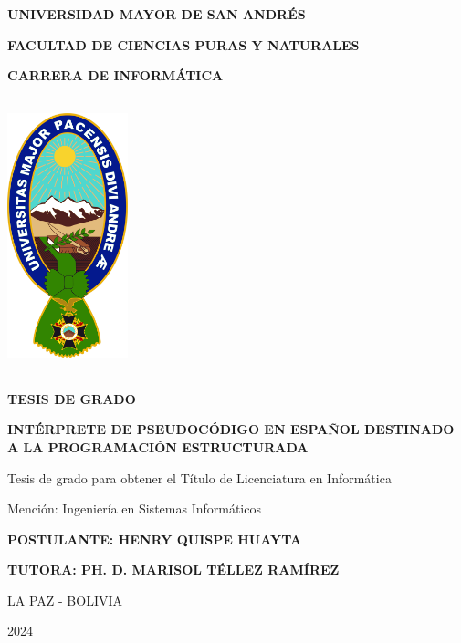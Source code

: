 \begin{titlepage}
  \centering
  {\fontsize{20}{0} \textbf{UNIVERSIDAD MAYOR DE SAN ANDRÉS}}\\
  {\fontsize{16}{0} \textbf{FACULTAD DE CIENCIAS PURAS Y NATURALES}\par}
  {\fontsize{16}{0} \textbf{CARRERA DE INFORMÁTICA}\par}
  \vspace{1cm}
  \includegraphics[height=8cm, width=3.5cm]{images/umsa.png}\par
  {\fontsize{12}{0} \textbf{TESIS DE GRADO}\par}
  {\fontsize{16}{0} \textbf{INTÉRPRETE DE PSEUDOCÓDIGO EN ESPAÑOL DESTINADO A LA PROGRAMACIÓN ESTRUCTURADA}\par}
  {\fontsize{11}{0} Tesis de grado para obtener el Título de Licenciatura en Informática\par}
  {\fontsize{11}{0} Mención: Ingeniería en Sistemas Informáticos\par}
  \vspace{1em}
  {\fontsize{14}{0} \textbf{POSTULANTE: \textnormal{HENRY QUISPE HUAYTA}}\par}
  {\fontsize{12}{0} \textbf{TUTORA: \textnormal{PH. D. MARISOL TÉLLEZ RAMÍREZ}}\par}
  \vspace{1em}
  {\fontsize{12}{0} LA PAZ - BOLIVIA \par}
  \vspace{-1em}
  {\fontsize{12}{0} 2024\par}
\end{titlepage}